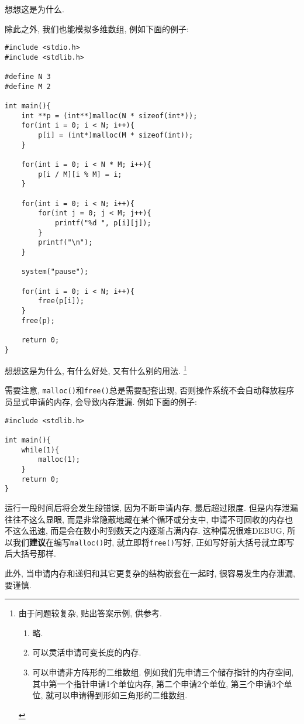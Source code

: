         想想这是为什么.

        除此之外, 我们也能模拟多维数组, 例如下面的例子:
\begin{lstlisting}
#include <stdio.h>
#include <stdlib.h>

#define N 3
#define M 2

int main(){
    int **p = (int**)malloc(N * sizeof(int*));
    for(int i = 0; i < N; i++){
        p[i] = (int*)malloc(M * sizeof(int));
    }

    for(int i = 0; i < N * M; i++){
        p[i / M][i % M] = i;
    }

    for(int i = 0; i < N; i++){
        for(int j = 0; j < M; j++){
            printf("%d ", p[i][j]);
        }
        printf("\n");
    }

    system("pause");

    for(int i = 0; i < N; i++){
        free(p[i]);
    }
    free(p);

    return 0;
}
\end{lstlisting}

        想想这是为什么, 有什么好处, 又有什么别的用法. \footnote{
            由于问题较复杂, 贴出答案示例, 供参考.
            \begin{enumerate}
                \item 略.
                \item 可以灵活申请可变长度的内存.
                \item 可以申请非方阵形的二维数组. 例如我们先申请三个储存指针的内存空间, 其中第一个指针申请1个单位内存, 第二个申请2个单位, 第三个申请3个单位, 就可以申请得到形如三角形的二维数组.
            \end{enumerate}
        }   

        需要注意, \texttt{malloc()}和\texttt{free()}总是需要配套出现, 否则操作系统不会自动释放程序员显式申请的内存, 会导致内存泄漏. 例如下面的例子:
\begin{lstlisting}
#include <stdlib.h>

int main(){
    while(1){
        malloc(1);
    }
    return 0;
}
\end{lstlisting}
        运行一段时间后将会发生段错误, 因为不断申请内存, 最后超过限度. 但是内存泄漏往往不这么显眼, 而是非常隐蔽地藏在某个循环或分支中, 申请不可回收的内存也不这么迅速, 而是会在数小时到数天之内逐渐占满内存. 这种情况很难DEBUG, 所以我们\textbf{建议}在编写\texttt{malloc()}时, 就立即将\texttt{free()}写好, 正如写好前大括号就立即写后大括号那样.

        此外, 当申请内存和递归和其它更复杂的结构嵌套在一起时, 很容易发生内存泄漏, 要谨慎.